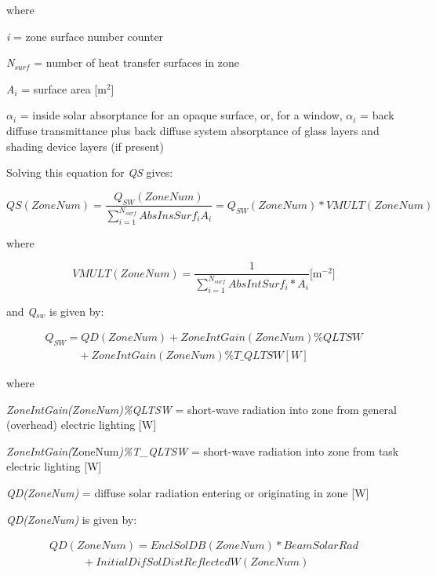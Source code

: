 where

\emph{i} = zone surface number counter

\emph{N\(_{surf}\)} = number of heat transfer surfaces in zone

\emph{A\(_{i}\)} = surface area {[}m\(^{2}\){]}

\({\alpha_i}\) = inside solar absorptance for an opaque surface, or, for a window, $\alpha_i$ = back diffuse transmittance plus back diffuse system absorptance of glass layers and shading device layers (if present)

Solving this equation for \emph{QS} gives:

\begin{equation}
QS(ZoneNum) = \frac{{{Q_{SW}}(ZoneNum)}}{{\sum\limits_{i = 1}^{{N_{surf}}} {AbsInsSur{f_i}{A_i}} }} = {Q_{SW}}(ZoneNum)*VMULT(ZoneNum)
\end{equation}

where

\begin{equation}
VMULT(ZoneNum) = \frac{1}{{\sum\limits_{i = 1}^{{N_{surf}}} {AbsIntSur{f_i}*{A_i}} }}{\mathrm{    [}}{{\mathrm{m}}^{{\mathrm{ - 2}}}}]
\end{equation}

and \emph{Q\(_{sw}\)} is given by:

\begin{equation}
\begin{array}{l}
{Q_{SW}} = QD(ZoneNum) + ZoneIntGain(ZoneNum)\% QLTSW \\
\quad \quad \quad + ZoneIntGain(ZoneNum)\% T\_QLTSW [W]
\end{array}
\end{equation}

where

\emph{ZoneIntGain(ZoneNum)\%QLTSW} = short-wave radiation into zone from general (overhead) electric lighting {[}W{]}

\emph{ZoneIntGain(}ZoneNum\emph{)\%T\_QLTSW} = short-wave radiation into zone from task electric lighting {[}W{]}

\emph{QD(ZoneNum)} = diffuse solar radiation entering or originating in zone {[}W{]}

\emph{QD(ZoneNum)} is given by:

\begin{equation}
\begin{array}{l}
QD(ZoneNum) = EnclSolDB(ZoneNum)*BeamSolarRad \\
\quad \quad \quad + InitialDifSolDistReflectedW(ZoneNum)
\end{array}
\end{equation}

